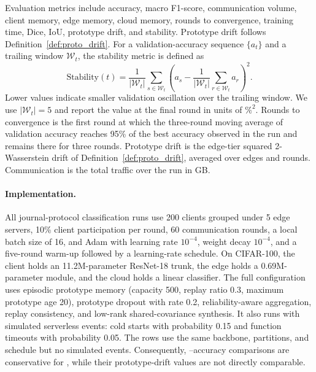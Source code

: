 Evaluation metrics include accuracy, macro F1-score, communication volume, client memory, edge memory, cloud memory, rounds to convergence, training time, Dice, IoU, prototype drift, and stability. Prototype drift follows Definition~\ref{def:proto_drift}. For a validation-accuracy sequence $\{a_t\}$ and a trailing window $\mathcal{W}_t$, the stability metric is defined as
\begin{equation}
    \mathrm{Stability}(t)
    =
    \frac{1}{|\mathcal{W}_t|}
    \sum_{s\in\mathcal{W}_t}
    \left(a_s-\frac{1}{|\mathcal{W}_t|}\sum_{r\in\mathcal{W}_t}a_r\right)^2 .
\end{equation}
Lower values indicate smaller validation oscillation over the trailing window. We use $|\mathcal{W}_t|=5$ and report the value at the final round in units of $\%^2$. Rounds to convergence is the first round at which the three-round moving average of validation accuracy reaches 95\% of the best accuracy observed in the run and remains there for three rounds. Prototype drift is the edge-tier squared 2-Wasserstein drift of Definition~\ref{def:proto_drift}, averaged over edges and rounds. Communication is the total traffic over the run in GB.

\paragraph{Implementation.}
All journal-protocol classification runs use 200 clients grouped under 5 edge servers, 10\% client participation per round, 60 communication rounds, a local batch size of 16, and Adam with learning rate $10^{-4}$, weight decay $10^{-4}$, and a five-round warm-up followed by a learning-rate schedule. On CIFAR-100, the client holds an 11.2M-parameter ResNet-18 trunk, the edge holds a 0.69M-parameter module, and the cloud holds a linear classifier. The full \ehsfp configuration uses episodic prototype memory (capacity 500, replay ratio 0.3, maximum prototype age 20), prototype dropout with rate 0.2, reliability-aware aggregation, replay consistency, and low-rank shared-covariance synthesis. It also runs with simulated serverless events: cold starts with probability 0.15 and function timeouts with probability 0.05. The \hsfp rows use the same backbone, partitions, and schedule but no simulated events. Consequently, \hsfp--\ehsfp accuracy comparisons are conservative for \ehsfp, while their prototype-drift values are not directly comparable.

